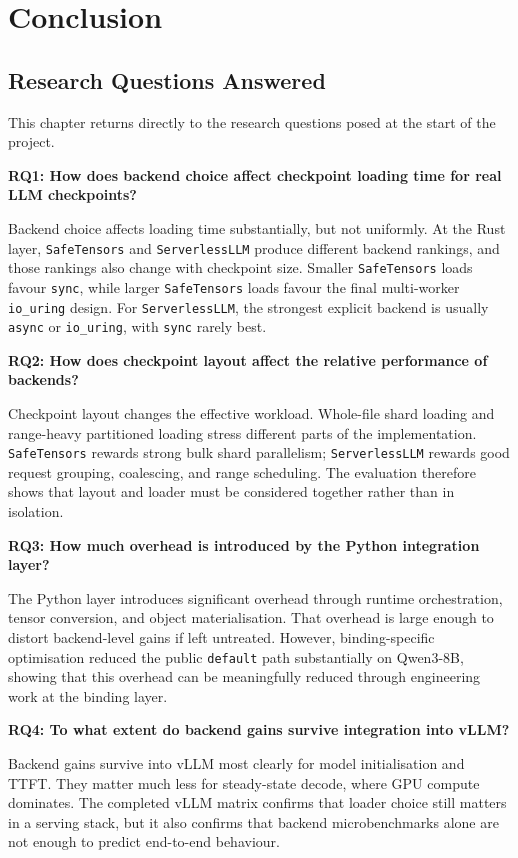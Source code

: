 \chapter{Conclusion}
\label{chap:conclusion}

\section{Research Questions Answered}

This chapter returns directly to the research questions posed at the start of the project.

\textbf{RQ1: How does backend choice affect checkpoint loading time for real LLM checkpoints?}

Backend choice affects loading time substantially, but not uniformly. At the Rust layer, \texttt{SafeTensors} and \texttt{ServerlessLLM} produce different backend rankings, and those rankings also change with checkpoint size. Smaller \texttt{SafeTensors} loads favour \texttt{sync}, while larger \texttt{SafeTensors} loads favour the final multi-worker \texttt{io\_uring} design. For \texttt{ServerlessLLM}, the strongest explicit backend is usually \texttt{async} or \texttt{io\_uring}, with \texttt{sync} rarely best.

\textbf{RQ2: How does checkpoint layout affect the relative performance of backends?}

Checkpoint layout changes the effective workload. Whole-file shard loading and range-heavy partitioned loading stress different parts of the implementation. \texttt{SafeTensors} rewards strong bulk shard parallelism; \texttt{ServerlessLLM} rewards good request grouping, coalescing, and range scheduling. The evaluation therefore shows that layout and loader must be considered together rather than in isolation.

\textbf{RQ3: How much overhead is introduced by the Python integration layer?}

The Python layer introduces significant overhead through runtime orchestration, tensor conversion, and object materialisation. That overhead is large enough to distort backend-level gains if left untreated. However, binding-specific optimisation reduced the public \texttt{default} path substantially on Qwen3-8B, showing that this overhead can be meaningfully reduced through engineering work at the binding layer.

\textbf{RQ4: To what extent do backend gains survive integration into vLLM?}

Backend gains survive into vLLM most clearly for model initialisation and TTFT. They matter much less for steady-state decode, where GPU compute dominates. The completed vLLM matrix confirms that loader choice still matters in a serving stack, but it also confirms that backend microbenchmarks alone are not enough to predict end-to-end behaviour.

